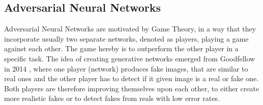 
\subsection{Adversarial Neural Networks}\label{sec:prev_nn_adv}
Adversarial Neural Networks are motivated by Game Theory, in a way that they incorporate usually two separate networks, denoted as players, playing a game against each other.
The game hereby is to outperform the other player in a specific task.
The idea of creating generative networks emerged from Goodfellow in 2014 \cite{Goodfellow2014}, where one player (network) produces fake images, that are similar to real ones and the other player has to detect if it given image is a real or fake one.
Both players are therefore improving themselves upon each other, to either create more realistic fakes or to detect fakes from reals with low error rates.

